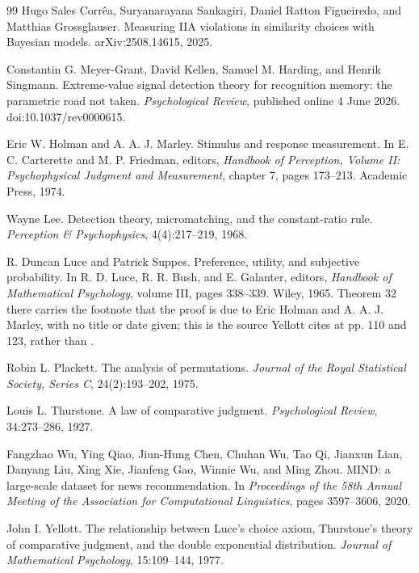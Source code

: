 \documentclass[11pt]{article}
\begin{document}
\begin{thebibliography}{99}
Hugo Sales Corr\^{e}a, Suryanarayana Sankagiri, Daniel Ratton Figueiredo, and Matthias
Grossglauser.
Measuring IIA violations in similarity choices with Bayesian models.
arXiv:2508.14615, 2025.

Constantin G. Meyer-Grant, David Kellen, Samuel M. Harding, and Henrik Singmann.
Extreme-value signal detection theory for recognition memory: the parametric road not taken.
\emph{Psychological Review}, published online 4 June 2026. doi:10.1037/rev0000615.

Eric W. Holman and A. A. J. Marley.
Stimulus and response measurement.
In E. C. Carterette and M. P. Friedman, editors, \emph{Handbook of Perception, Volume II:
Psychophysical Judgment and Measurement}, chapter 7, pages 173--213. Academic Press, 1974.

Wayne Lee.
Detection theory, micromatching, and the constant-ratio rule.
\emph{Perception \& Psychophysics}, 4(4):217--219, 1968.

R. Duncan Luce and Patrick Suppes.
Preference, utility, and subjective probability.
In R. D. Luce, R. R. Bush, and E. Galanter, editors, \emph{Handbook of Mathematical
Psychology}, volume III, pages 338--339. Wiley, 1965.
Theorem 32 there carries the footnote that the proof is due to Eric Holman and
A. A. J. Marley, with no title or date given; this is the source Yellott \cite{yellott1977}
cites at pp. 110 and 123, rather than \cite{holman1974}.

Robin L. Plackett.
The analysis of permutations.
\emph{Journal of the Royal Statistical Society, Series C}, 24(2):193--202, 1975.

Louis L. Thurstone.
A law of comparative judgment.
\emph{Psychological Review}, 34:273--286, 1927.

Fangzhao Wu, Ying Qiao, Jiun-Hung Chen, Chuhan Wu, Tao Qi, Jianxun Lian, Danyang Liu,
Xing Xie, Jianfeng Gao, Winnie Wu, and Ming Zhou.
MIND: a large-scale dataset for news recommendation.
In \emph{Proceedings of the 58th Annual Meeting of the Association for Computational
Linguistics}, pages 3597--3606, 2020.

John I. Yellott.
The relationship between Luce's choice axiom, Thurstone's theory of comparative
judgment, and the double exponential distribution.
\emph{Journal of Mathematical Psychology}, 15:109--144, 1977.

\end{thebibliography}
\end{document}
